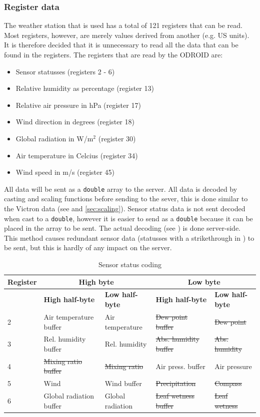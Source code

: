 \subsubsection{Register data}\label{sec:weather_station_register_data}
The weather station that is used has a total of 121 registers that can be read. Most registers, however, are merely values derived from another (e.g. US units). It is therefore decided that it is unnecessary to read all the data that can be found in the registers. The registers that are read by the ODROID are:
\begin{itemize}
\item Sensor statusses (registers 2 - 6)
\item Relative humidity as percentage (register 13)
\item Relative air pressure in hPa (register 17)
\item Wind direction in degrees (register 18)
\item Global radiation in W/m$^2$ (register 30)
\item Air temperature in Celcius (register 34)
\item Wind speed in m/s (register 45)\\
\end{itemize}

All data will be sent as a \verb|double| array to the server. All data is decoded by casting and scaling functions before sending to the sever, this is done similar to the Victron data (see  and \ref{sec:scaling}). Sensor status data is not sent decoded when cast to a \verb|double|, however it is easier to send as a \verb|double| because it can be placed in the array to be sent. The actual decoding (see ) is done server-side. This method causes redundant sensor data (statusses with a strikethrough in ) to be sent, but this is hardly of any impact on the server.

\begin{table}
\centering
\caption{Sensor status coding}
\begin{tabular}{|l|l|l|l|l|}
\hline
\textbf{Register} & \multicolumn{2}{c|}{\textbf{High byte}}  & \multicolumn{2}{c|}{\textbf{Low byte}} \\ \hline
  & \textbf{High half-byte} & \textbf{Low half-byte} & \textbf{High half-byte} & \textbf{Low half-byte} \\ \hline
2 & Air temperature buffer & Air temperature & \st{Dew point buffer} & \st{Dew point} \\ \hline
3 & Rel. humidity buffer & Rel. humidity & \st{Abs. humidity buffer} & \st{Abs. humidity} \\ \hline
4 & \st{Mixing ratio buffer} & \st{Mixing ratio} & Air press. buffer & Air pressure \\ \hline
5 & Wind & Wind buffer & \st{Precipitation} & \st{Compass} \\ \hline
6 & Global radiation buffer & Global radiation & \st{Leaf wetness buffer} & \st{Leaf wetness} \\ \hline
\end{tabular}
\label{sensor_status_list}
\end{table}

